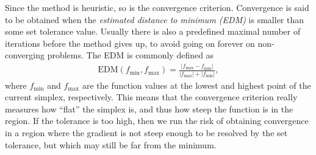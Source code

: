 \documentclass[twoside,english]{uiofysmaster}
\begin{document}
Since the method is heuristic, so is the convergence criterion. Convergence is said to be obtained when the {\it estimated distance to minimum (EDM)} is smaller than some set tolerance value. Usually there is also a predefined maximal number of iterations before the method gives up, to avoid going on forever on non-converging problems. The EDM is commonly defined as
\begin{align}
	\mathrm{EDM}(f_\mathrm{min},f_\mathrm{max}) = \frac{|f_\mathrm{max}-f_\mathrm{min}|}{|f_\mathrm{max}| + |f_\mathrm{min}|},
\end{align}
where $f_\mathrm{min}$ and $f_\mathrm{max}$ are the function values at the lowest and highest point of the current simplex, respectively. This means that the convergence criterion really measures how ``flat'' the simplex is, and thus how steep the function is in the region. If the tolerance is too high, then we run the risk of obtaining convergence in a region where the gradient is not steep enough to be resolved by the set tolerance, but which may still be far from the minimum.
\end{document}
